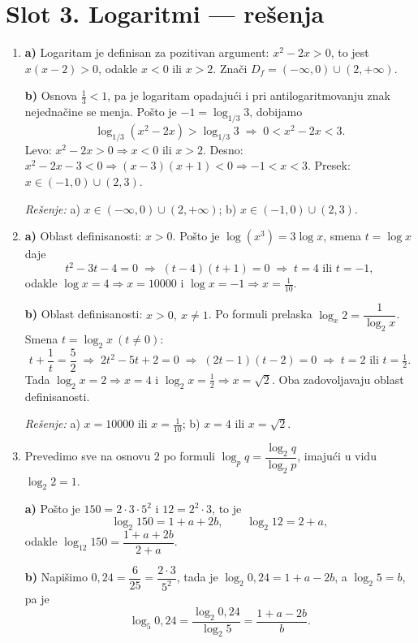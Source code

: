 \section*{Slot 3. Logaritmi — rešenja}
\begin{enumerate}[label=\arabic*.]
\item
\textbf{a)} Logaritam je definisan za pozitivan argument: $x^{2}-2x>0$, to jest $x(x-2)>0$, odakle $x<0$ ili $x>2$. Znači $D_f=(-\infty,0)\cup(2,+\infty)$.

\textbf{b)} Osnova $\tfrac13<1$, pa je logaritam opadajući i pri antilogaritmovanju znak nejednačine se menja. Pošto je $-1=\log_{1/3}3$, dobijamo
\[
\log_{1/3}\left(x^{2}-2x\right) > \log_{1/3}3 \;\Rightarrow\; 0 < x^{2}-2x < 3.
\]
Levo: $x^{2}-2x>0 \Rightarrow x<0$ ili $x>2$. Desno: $x^{2}-2x-3<0 \Rightarrow (x-3)(x+1)<0 \Rightarrow -1<x<3$. Presek: $x\in(-1,0)\cup(2,3)$.

\textit{Rešenje:} a) $x\in(-\infty,0)\cup(2,+\infty)$; \quad b) $x\in(-1,0)\cup(2,3)$.

\item
\textbf{a)} Oblast definisanosti: $x>0$. Pošto je $\log(x^{3})=3\log x$, smena $t=\log x$ daje
\[
t^{2}-3t-4=0 \;\Rightarrow\; (t-4)(t+1)=0 \;\Rightarrow\; t=4 \text{ ili } t=-1,
\]
odakle $\log x=4 \Rightarrow x=10000$ i $\log x=-1 \Rightarrow x=\tfrac1{10}$.

\textbf{b)} Oblast definisanosti: $x>0,\ x\ne1$. Po formuli prelaska $\log_{x}2=\dfrac{1}{\log_{2}x}$. Smena $t=\log_{2}x\ (t\ne0)$:
\[
t+\frac{1}{t}=\frac{5}{2} \;\Rightarrow\; 2t^{2}-5t+2=0 \;\Rightarrow\; (2t-1)(t-2)=0 \;\Rightarrow\; t=2 \text{ ili } t=\tfrac12.
\]
Tada $\log_{2}x=2 \Rightarrow x=4$ i $\log_{2}x=\tfrac12 \Rightarrow x=\sqrt{2}$. Oba zadovoljavaju oblast definisanosti.

\textit{Rešenje:} a) $x=10000$ ili $x=\tfrac{1}{10}$; \quad b) $x=4$ ili $x=\sqrt{2}$.

\item Prevedimo sve na osnovu $2$ po formuli $\log_{p}q=\dfrac{\log_{2}q}{\log_{2}p}$, imajući u vidu $\log_{2}2=1$.

\textbf{a)} Pošto je $150=2\cdot3\cdot5^{2}$ i $12=2^{2}\cdot3$, to je
\[
\log_{2}150=1+a+2b,\qquad \log_{2}12=2+a,
\]
odakle $\log_{12}150=\dfrac{1+a+2b}{2+a}$.

\textbf{b)} Napišimo $0{,}24=\dfrac{6}{25}=\dfrac{2\cdot3}{5^{2}}$, tada je $\log_{2}0{,}24=1+a-2b$, a $\log_{2}5=b$, pa je
\[
\log_{5}0{,}24=\frac{\log_{2}0{,}24}{\log_{2}5}=\frac{1+a-2b}{b}.
\]


\end{enumerate}
